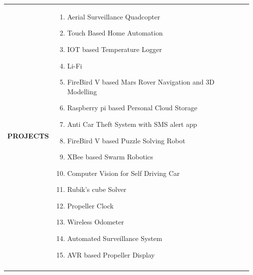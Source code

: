 \documentclass[a4paper]{article}
\begin{document}
\begin{longtable}{@{}m{3.0cm}m{14cm}@{}}
			
			\textrm{\textbf {PROJECTS}} & 
				\begin{enumerate}
					\itemsep -2pt
					\item
					Aerial Surveillance Quadcopter
					\item
					Touch Based Home Automation
					\item
					IOT based Temperature Logger
					\item
					Li-Fi
					\item
					FireBird V based Mars Rover Navigation and 3D Modelling
					\item
					Raspberry pi based Personal Cloud Storage
					\item
					Anti Car Theft System with SMS alert app
					\item
					FireBird V based Puzzle Solving Robot
					\item
					XBee based Swarm Robotics
					\item
					Computer Vision for Self Driving Car
					\item
					Rubik's cube Solver
					\item
					Propeller Clock
					\item
					Wireless Odometer
					\item
					Automated Surveillance System
					\item
					AVR based Propeller Display
				\end{enumerate}
			\\ \\
			

\end{longtable}
\end{document}

